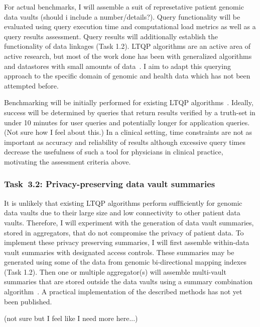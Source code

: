 \documentclass[a4paper,11pt]{article}
\begin{document}
\begin{refsection}
For actual benchmarks, I will assemble a suit of represetative patient genomic data vaults (should i include a number/details?).
Query functionality will be evaluated using query execution time and computational load metrics as well as a query results assessment. 
Query results will additionally establish the functionality of data linkages (Task 1.2).
LTQP algorithms are an active area of active research, but most of the work done has been with generalized algorithms and datastores with small amounts of data~\cite{taelman_LTQP_2023}.
I aim to adapt this querying approach to the specific domain of genomic and health data which has not been attempted before. 

Benchmarking will be initially performed for existing LTQP algorithms~\cite{taelman_LTQP_2023}.
Ideally, success will be determined by queries that return results verified by a truth-set in under 10 minutes for user queries and potentially longer for application queries. (Not sure how I feel about this.)
In a clinical setting, time constraints are not as important as accuracy and reliability of results although excessive query times decrease the usefulness of such a tool for physicians in clinical practice, motivating the assessment criteria above.


\newcommand\WPcb{Privacy-preserving data vault summaries}
\subsubsection{Task~3.2: \WPcb}

It is unlikely that existing LTQP algorithms perform suffficiently for genomic data vaults due to their large size and low connectivity to other patient data vaults.
Therefore, I will experiment with the generation of data vault summaries, stored in aggregators, that do not compromise the privacy of patient data. 
To implement these privacy preserving summaries, I will first assemble within-data vault summaries with designated access controls.
These summaries may be generated using some of the data from genomic bi-directional mapping indexes (Task 1.2).
Then one or multiple aggregator(s) will assemble multi-vault summaries that are stored outside the data vaults using a summary combination algorithm~\cite{taelman_privacyAgg_2020}.
A practical implementation of the described methods has not yet been published.

(not sure but I feel like I need more here...)


\newcommand\WPcc{Algorithm incorporation of PGS data indexes and data vault summaries}

\end{refsection}
\end{document}
